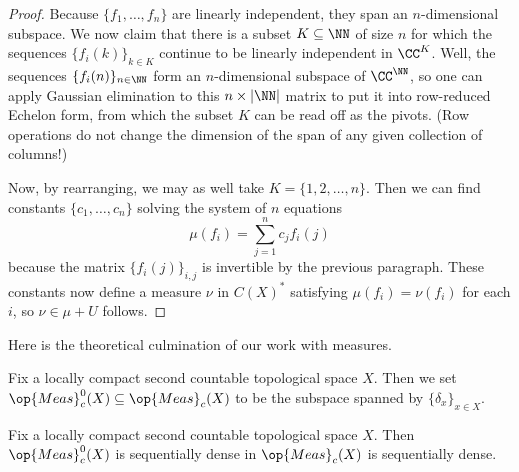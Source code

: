 \documentclass[../notes.tex]{subfiles}
\begin{document}
\begin{proof}


	Because $\{f_1,\ldots,f_n\}$ are linearly independent, they span an $n$-dimensional subspace. We now claim that there is a subset $K\subseteq\NN$ of size $n$ for which the sequences $\{f_i(k)\}_{k\in K}$ continue to be linearly independent in $\CC^K$. Well, the sequences $\{f_i(n)\}_{n\in\NN}$ form an $n$-dimensional subspace of $\CC^\NN$, so one can apply Gaussian elimination to this $n\times\left|\NN\right|$ matrix to put it into row-reduced Echelon form, from which the subset $K$ can be read off as the pivots. (Row operations do not change the dimension of the span of any given collection of columns!)

	Now, by rearranging, we may as well take $K=\{1,2,\ldots,n\}$. Then we can find constants $\{c_1,\ldots,c_n\}$ solving the system of $n$ equations
	\[\mu(f_i)=\sum_{j=1}^nc_jf_i(j)\]
	because the matrix $\{f_i(j)\}_{i,j}$ is invertible by the previous paragraph. These constants now define a measure $\nu$ in $C(X)^*$ satisfying $\mu(f_i)=\nu(f_i)$ for each $i$, so $\nu\in\mu+U$ follows.
\end{proof}
Here is the theoretical culmination of our work with measures.
\begin{notation}
	Fix a locally compact second countable topological space $X$. Then we set $\op{Meas}_c^0(X)\subseteq\op{Meas}_c(X)$ to be the subspace spanned by $\{\delta_x\}_{x\in X}$.
\end{notation}
\begin{proposition} \label{prop:dirac-dense}
	Fix a locally compact second countable topological space $X$. Then $\op{Meas}_c^0(X)$ is sequentially dense in $\op{Meas}_c(X)$ is sequentially dense.
\end{proposition}
\end{document}
